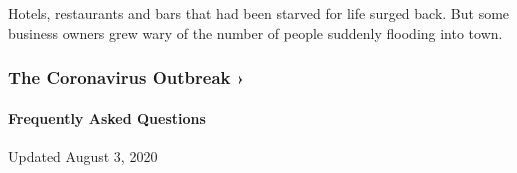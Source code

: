 Hotels, restaurants and bars that had been starved for life surged back.
But some business owners grew wary of the number of people suddenly
flooding into town.

\href{https://www.nytimes.com/news-event/coronavirus?action=click\&pgtype=Article\&state=default\&region=MAIN_CONTENT_3\&context=storylines_faq}{}

\hypertarget{the-coronavirus-outbreak-}{%
\subsubsection{The Coronavirus Outbreak
›}\label{the-coronavirus-outbreak-}}

\hypertarget{frequently-asked-questions}{%
\paragraph{Frequently Asked
Questions}\label{frequently-asked-questions}}

Updated August 3, 2020


